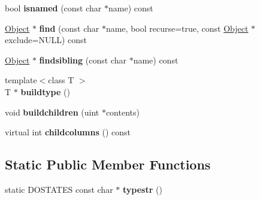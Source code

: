 \begin{DoxyCompactItemize}
bool {\bfseries isnamed} (const char $\ast$name) const
\item 
\mbox{\label{struct_u_i_1_1_object_a3ac0616591704dce4533f1b82fb28f49}} 
\hyperlink{struct_u_i_1_1_object}{Object} $\ast$ {\bfseries find} (const char $\ast$name, bool recurse=true, const \hyperlink{struct_u_i_1_1_object}{Object} $\ast$exclude=N\+U\+LL) const
\item 
\mbox{\label{struct_u_i_1_1_object_a547939d273851d3c0120a5e62f72a50f}} 
\hyperlink{struct_u_i_1_1_object}{Object} $\ast$ {\bfseries findsibling} (const char $\ast$name) const
\item 
\mbox{\label{struct_u_i_1_1_object_a1931d1861294e901c8340f79125711f7}} 
{\footnotesize template$<$class T $>$ }\\T $\ast$ {\bfseries buildtype} ()
\item 
\mbox{\label{struct_u_i_1_1_object_ac5342083612f0a5536bc5f8d4b7c10cb}} 
void {\bfseries buildchildren} (uint $\ast$contents)
\item 
\mbox{\label{struct_u_i_1_1_object_a028ef63e2c5db731e35a7616c8460014}} 
virtual int {\bfseries childcolumns} () const
\end{DoxyCompactItemize}
\subsection*{Static Public Member Functions}
\begin{DoxyCompactItemize}
\item 
\mbox{\label{struct_u_i_1_1_object_a26cea3e697860112dd89b8dcfaa91e25}} 
static D\+O\+S\+T\+A\+T\+ES const char $\ast$ {\bfseries typestr} ()
\end{DoxyCompactItemize}
